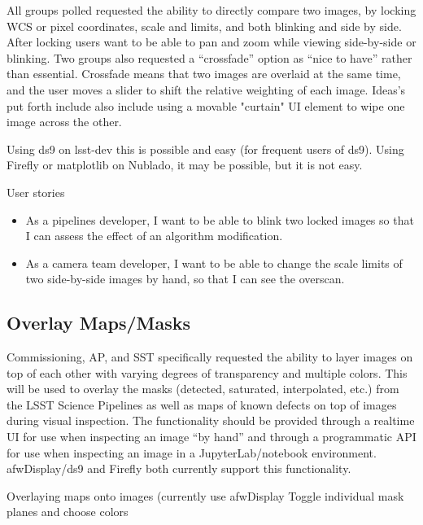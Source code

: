 All groups polled requested the ability to directly compare two images, by locking WCS or pixel coordinates, scale and limits, and both blinking and side by side.
After locking users want to be able to pan and zoom while viewing side-by-side or blinking.
Two groups also requested a ``crossfade'' option as ``nice to have'' rather than essential.
Crossfade means that two images are overlaid at the same time, and the user moves a slider to shift the relative weighting of each image.
Ideas's put forth include also include using a movable "curtain" UI element to wipe one image across the other.

Using ds9 on lsst-dev this is possible and easy (for frequent users of ds9).
Using Firefly or matplotlib on Nublado, it may be possible, but it is not easy.

User stories
\begin{itemize}
\item{As a pipelines developer,  I want to be able to blink two locked images so that I can assess the effect of an algorithm modification.}
\item{As a camera team developer,  I want to be able to change the scale limits of two side-by-side images by hand, so that I can see the overscan.}
\end{itemize}


\subsection{Overlay Maps/Masks}
\label{sec:features:masks}

Commissioning, AP, and SST specifically requested the ability to layer images on
top of each other with varying degrees of transparency and multiple colors.
This will be used to overlay the masks (detected, saturated, interpolated, etc.)
from the LSST Science Pipelines as well as maps of known defects on top of
images during visual inspection.  The functionality should be provided through
a realtime UI for use when inspecting an image ``by hand'' and through a
programmatic API for use when inspecting an image in a JupyterLab/notebook
environment.  afwDisplay/ds9 and Firefly both currently support this
functionality.

Overlaying maps onto images (currently use afwDisplay
Toggle individual mask planes and choose colors

